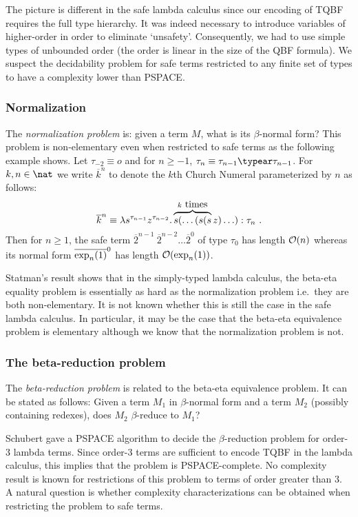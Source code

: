 The picture is different in the safe lambda calculus since our
encoding of TQBF requires the full type hierarchy. It
was indeed necessary to introduce variables of higher-order in order
to eliminate `unsafety'. Consequently, we had to use simple types of
unbounded order (the order is linear in the size of the QBF
formula). We suspect the decidability problem for safe terms
restricted to any finite set of types to have a complexity lower
than PSPACE.


\subsubsection{Normalization}
The \emph{normalization problem} is: given a term $M$, what is its $\beta$-normal form? This problem is non-elementary even when restricted to safe terms as the following example shows. Let $\tau_{-2}
\equiv o$ and for $n\geq -1$, $\tau_n \equiv \tau_{n-1}\typear
\tau_{n-1}$. For $k,n\in \nat$ we write $\overline{k}^n$ to denote
the $k$th Church Numeral parameterized by $n$ as follows:
$$\overline{k}^n \equiv \lambda s^{\tau_{n-1}}
z^{\tau_{n-2}} . \overbrace{s( \ldots (s (s}^{k\hbox{ times}}z)
\ldots) : \tau_n \ .$$ Then for $n\geq1$, the safe term
$\overline{2}^{n-1}~\overline{2}^{n-2}\ldots \overline{2}^0$ of type
$\tau_0$ has length $\mathcal{O}(n)$ whereas its normal form
$\overline{\exp_{n}(1)}^0$ has length $\mathcal{O}(\exp_{n}(1))$.

Statman's result shows that in the simply-typed lambda calculus, the
beta-eta equality problem is essentially as hard as the
normalization problem i.e.~they are both non-elementary. It is not known whether this is still the
case in the safe lambda calculus. In particular, it may be the case
that the beta-eta equivalence problem is elementary although we know that the normalization problem is not.


\subsubsection{The beta-reduction problem}
The \emph{beta-reduction problem} is related to the beta-eta equivalence problem. It can be stated as follows: Given a term $M_1$ in $\beta$-normal form and a term $M_2$ (possibly containing redexes), does $M_2$ $\beta$-reduce to $M_1$?

Schubert \cite{schubert2001cbr} gave a PSPACE algorithm to decide the $\beta$-reduction problem for order-$3$
lambda terms. Since order-$3$ terms are sufficient to encode TQBF in the lambda calculus, this implies that the problem is PSPACE-complete. No complexity result is known for restrictions of this problem to terms of order greater than $3$. A natural question is whether complexity characterizations can be obtained when restricting the problem to safe terms.
